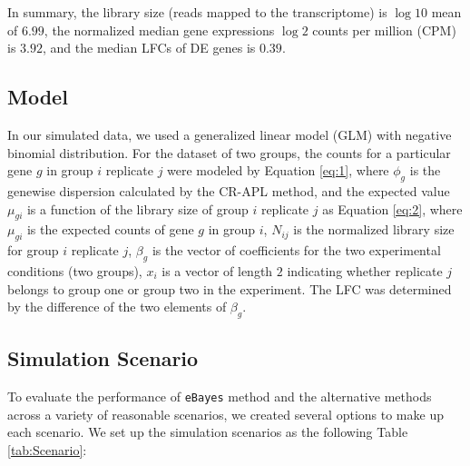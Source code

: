 In summary, the library size (reads mapped to the transcriptome) is $\log{10}$ mean of $6.99$, the normalized median gene expressions $\log{2}$ counts per million (CPM) is $3.92$, and the median LFCs of DE genes is $0.39$. 


\subsection{Model}

In our simulated data, we used a generalized linear model (GLM) with negative binomial distribution. For the dataset of two groups, the counts for a particular gene $g$ in group $i$ replicate $j$ were modeled by Equation \eqref{eq:1}, where $\phi_g$ is the genewise dispersion calculated by the CR-APL method, and the expected value $\mu_{gi}$ is a function of the library size of group $i$ replicate $j$ as Equation \ref{eq:2}, where $\mu_{gi}$ is the expected counts of gene $g$ in group $i$, $N_{ij}$ is the normalized library size for group $i$ replicate $j$, $\beta_g$ is the vector of coefficients for the two experimental conditions (two groups), $x_{i}$ is a vector of length $2$ indicating whether replicate $j$ belongs to group one or group two in the experiment. The LFC was determined by the difference of the two elements of $\beta_g$\citep{ching2014power}. 



\subsection{Simulation Scenario}

To evaluate the performance of \texttt{eBayes} method and the alternative methods across a variety of reasonable scenarios, we created several options to make up each scenario. We set up the simulation scenarios as the following Table \ref{tab:Scenario}:

